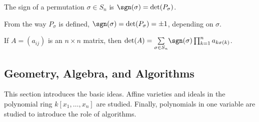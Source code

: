 \documentclass[crop=false,class=book,oneside]{standalone}
\begin{document}
                \begin{definition}
                    The sign of a permutation $\sigma\in S_{n}$
                    is $\sgn(\sigma) = \det(P_{\sigma})$.
                \end{definition}
                \begin{remark}
                    From the way $P_{\sigma}$ is defined,
                    $\sgn(\sigma)=\det(P_{\sigma})=\pm 1$,
                    depending on $\sigma$.
                \end{remark}
                \begin{theorem}
                    If $A=(a_{ij})$ is an $n\times n$ matrix, then
                    $\det(A)=\underset{\sigma\in S_n}%
                     \sum\sgn(\sigma)\prod_{k=1}^{n}a_{k\sigma(k)}$.
                \end{theorem}
        \subsection{Geometry, Algebra, and Algorithms}
            This section introduces the basic ideas. Affine
            varieties and ideals in the polynomial ring
            $k[x_1,\hdots,x_n]$ are studied. Finally, polynomials
            in one variable are studied to introduce the role
            of algorithms.
\end{document}
